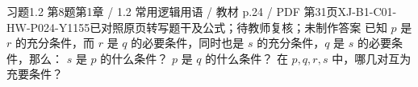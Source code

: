 \par\noindent\begin{minipage}{\linewidth}
\begin{bankitem}{习题1.2 第8题}{第1章 / 1.2 常用逻辑用语 / 教材 p.24 / PDF 第31页}{XJ-B1-C01-HW-P024-Y1155}{已对照原页转写题干及公式；待教师复核；未制作答案}
已知 $p$ 是 $r$ 的充分条件，而 $r$ 是 $q$ 的必要条件，同时也是 $s$ 的充分条件，$q$ 是 $s$ 的必要条件，那么：
$s$ 是 $p$ 的什么条件？
$p$ 是 $q$ 的什么条件？
在 $p,q,r,s$ 中，哪几对互为充要条件？
\end{bankitem}
\end{minipage}\par\medskip
